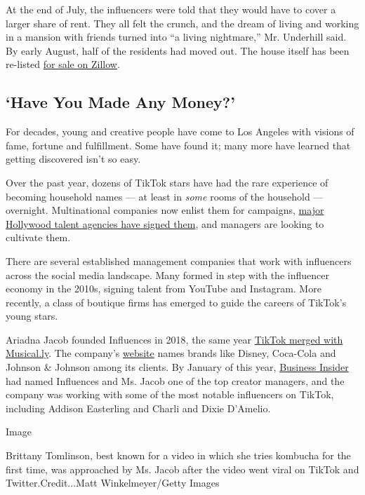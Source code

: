 At the end of July, the influencers were told that they would have to
cover a larger share of rent. They all felt the crunch, and the dream of
living and working in a mansion with friends turned into ``a living
nightmare,'' Mr. Underhill said. By early August, half of the residents
had moved out. The house itself has been re-listed
\href{https://www.zillow.com/homedetails/4130-Parva-Ave-Los-Angeles-CA-90027/125935785_zpid/}{for
sale on Zillow}.

\hypertarget{have-you-made-any-money}{%
\subsection{`Have You Made Any Money?'}\label{have-you-made-any-money}}

For decades, young and creative people have come to Los Angeles with
visions of fame, fortune and fulfillment. Some have found it; many more
have learned that getting discovered isn't so easy.

Over the past year, dozens of TikTok stars have had the rare experience
of becoming household names --- at least in \emph{some} rooms of the
household --- overnight. Multinational companies now enlist them for
campaigns,
\href{https://www.nytimes3xbfgragh.onion/2020/04/06/style/hollywood-agents-influencers.html}{major
Hollywood talent agencies have signed them}, and managers are looking to
cultivate them.

There are several established management companies that work with
influencers across the social media landscape. Many formed in step with
the influencer economy in the 2010s, signing talent from YouTube and
Instagram. More recently, a class of boutique firms has emerged to guide
the careers of TikTok's young stars.

Ariadna Jacob founded Influences in 2018, the same year
\href{https://www.nytimes3xbfgragh.onion/2019/03/10/style/what-is-tik-tok.html}{TikTok
merged with Musical.ly}. The company's
\href{http://influences.com/}{website} names brands like Disney,
Coca-Cola and Johnson \& Johnson among its clients. By January of this
year,
\href{https://www.businessinsider.com/top-influencer-agents-managers-database-youtube-instagram-tiktok-2020-6}{Business
Insider} had named Influences and Ms. Jacob one of the top creator
managers, and the company was working with some of the most notable
influencers on TikTok, including Addison Easterling and Charli and Dixie
D'Amelio.

Image

Brittany Tomlinson, best known for a video in which she tries kombucha
for the first time, was approached by Ms. Jacob after the video went
viral on TikTok and Twitter.Credit...Matt Winkelmeyer/Getty Images

